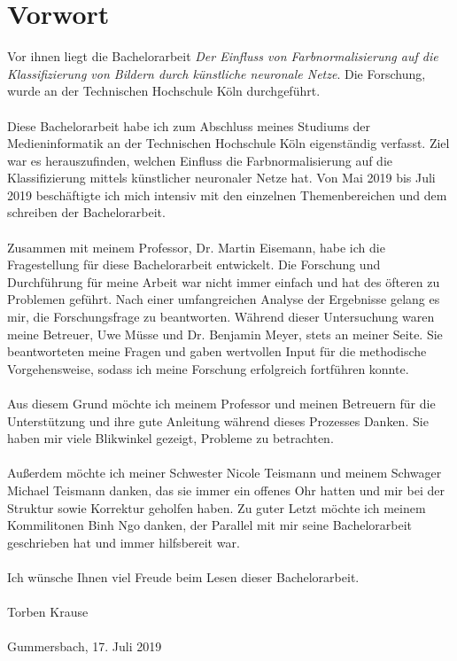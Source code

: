 \documentclass[a4paper,12pt,oneside]{article}
\begin{document}
  \newpage
  \section*{Vorwort}
Vor ihnen liegt die Bachelorarbeit \textit{Der Einfluss von Farbnormalisierung auf die Klassifizierung von Bildern durch künstliche neuronale Netze}. Die Forschung, wurde an der Technischen Hochschule Köln durchgeführt.\\\\
Diese Bachelorarbeit habe ich zum Abschluss meines Studiums der Medieninformatik an der Technischen Hochschule Köln eigenständig verfasst. Ziel war es herauszufinden, welchen Einfluss die Farbnormalisierung auf die Klassifizierung mittels künstlicher neuronaler Netze hat. Von Mai 2019 bis Juli 2019 beschäftigte ich mich intensiv mit den einzelnen Themenbereichen und dem schreiben der Bachelorarbeit.\\\\
Zusammen mit meinem Professor, Dr. Martin Eisemann, habe ich die Fragestellung für diese Bachelorarbeit entwickelt. Die Forschung und Durchführung für meine Arbeit war nicht immer einfach und hat des öfteren zu Problemen geführt. Nach einer umfangreichen Analyse der Ergebnisse gelang es mir, die Forschungsfrage zu beantworten. Während dieser Untersuchung waren meine Betreuer, Uwe Müsse und Dr. Benjamin Meyer, stets an meiner Seite. Sie beantworteten meine Fragen und gaben wertvollen Input für die methodische Vorgehensweise, sodass ich meine Forschung erfolgreich fortführen konnte.\\\\
Aus diesem Grund möchte ich meinem Professor und meinen Betreuern für die Unterstützung und ihre gute Anleitung während dieses Prozesses Danken. Sie haben mir viele Blikwinkel gezeigt, Probleme zu betrachten.\\\\
Außerdem möchte ich meiner Schwester Nicole Teismann und meinem Schwager Michael Teismann danken, das sie immer ein offenes Ohr hatten und mir bei der Struktur sowie Korrektur geholfen haben. Zu guter Letzt möchte ich meinem Kommilitonen Binh Ngo danken, der Parallel mit mir seine Bachelorarbeit geschrieben hat und immer hilfsbereit war.\\\\
Ich wünsche Ihnen viel Freude beim Lesen dieser Bachelorarbeit.\\\\
Torben Krause\\\\
Gummersbach, 17. Juli 2019
\newpage
\end{document}
